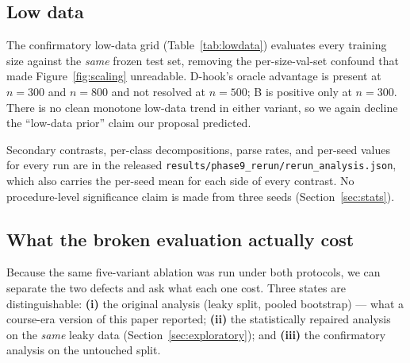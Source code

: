 \subsection{Low data}

The confirmatory low-data grid (Table~\ref{tab:lowdata}) evaluates every
training size against the \emph{same} frozen test set, removing the
per-size-val-set confound that made Figure~\ref{fig:scaling} unreadable.
D-hook's oracle advantage is present at $n{=}300$ and $n{=}800$ and not
resolved at $n{=}500$; B is positive only at $n{=}300$. There is no clean
monotone low-data trend in either variant, so we again decline the
``low-data prior'' claim our proposal predicted.

Secondary contrasts, per-class decompositions, parse rates, and per-seed
values for every run are in the released
\texttt{results/phase9\_rerun/rerun\_analysis.json}, which also carries the
per-seed mean for each side of every contrast. No procedure-level
significance claim is made from three seeds (Section~\ref{sec:stats}).

\subsection{What the broken evaluation actually cost}
\label{sec:cost}

Because the same five-variant ablation was run under both protocols, we can
separate the two defects and ask what each one cost. Three states are
distinguishable: \textbf{(i)} the original analysis (leaky split, pooled
bootstrap) --- what a course-era version of this paper reported;
\textbf{(ii)} the statistically repaired analysis on the \emph{same} leaky
data (Section~\ref{sec:exploratory}); and \textbf{(iii)} the confirmatory
analysis on the untouched split.


